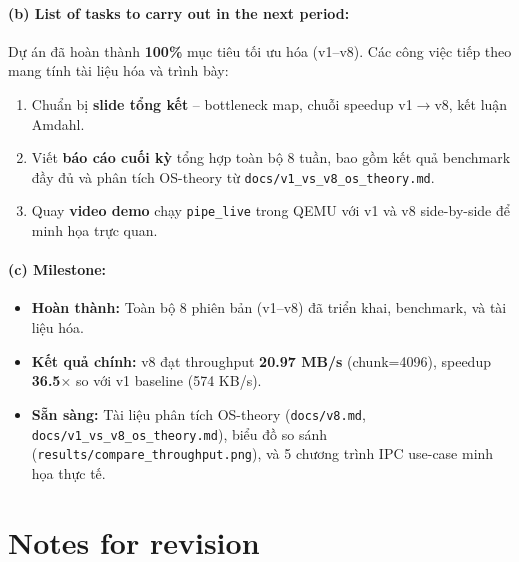 \documentclass[11pt,a4paper]{article}
\begin{document}
\paragraph{(b) List of tasks to carry out in the next period:}

Dự án đã hoàn thành \textbf{100\%} mục tiêu tối ưu hóa (v1--v8). Các công việc tiếp theo mang tính tài liệu hóa và trình bày:

\begin{enumerate}
  \item Chuẩn bị \textbf{slide tổng kết} -- bottleneck map, chuỗi speedup v1$\rightarrow$v8, kết luận Amdahl.
  \item Viết \textbf{báo cáo cuối kỳ} tổng hợp toàn bộ 8 tuần, bao gồm kết quả benchmark đầy đủ và phân tích OS-theory từ \texttt{docs/v1\_vs\_v8\_os\_theory.md}.
  \item Quay \textbf{video demo} chạy \texttt{pipe\_live} trong QEMU với v1 và v8 side-by-side để minh họa trực quan.
\end{enumerate}

\paragraph{(c) Milestone:}
\begin{itemize}
  \item \textbf{Hoàn thành:} Toàn bộ 8 phiên bản (v1--v8) đã triển khai, benchmark, và tài liệu hóa.
  \item \textbf{Kết quả chính:} v8 đạt throughput \textbf{20.97 MB/s} (chunk=4096), speedup \textbf{36.5$\times$} so với v1 baseline (574 KB/s).
  \item \textbf{Sẵn sàng:} Tài liệu phân tích OS-theory (\texttt{docs/v8.md}, \texttt{docs/v1\_vs\_v8\_os\_theory.md}), biểu đồ so sánh (\texttt{results/compare\_throughput.png}), và 5 chương trình IPC use-case minh họa thực tế.
\end{itemize}

\section{Notes for revision}
\end{document}
